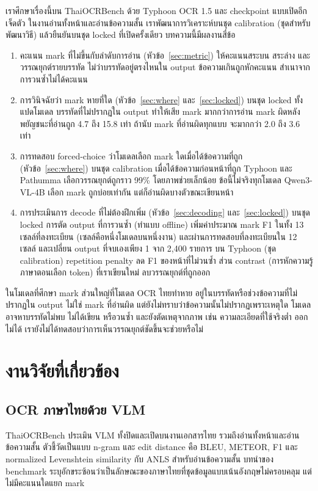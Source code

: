 เราศึกษาเรื่องนี้บน ThaiOCRBench ด้วย Typhoon OCR 1.5 และ checkpoint แบบเปิดอีกเจ็ดตัว ในงานอ่านทั้งหน้าและอ่านข้อความสั้น เราพัฒนาการวิเคราะห์บนชุด calibration (ชุดสำหรับพัฒนาวิธี) แล้วยืนยันบนชุด locked ที่เปิดครั้งเดียว บทความนี้มีผลงานสี่ข้อ
\begin{enumerate}
\item คะแนน mark ที่ไม่ขึ้นกับลำดับการอ่าน (หัวข้อ~\ref{sec:metric}) ให้คะแนนสระบน สระล่าง และวรรณยุกต์รายบรรทัด ไม่ว่าบรรทัดอยู่ตรงไหนใน output ข้อความเกินถูกหักคะแนน สำเนาจากการวนซ้ำไม่ได้คะแนน
\item การวินิจฉัยว่า mark หายที่ใด (หัวข้อ~\ref{sec:where} และ~\ref{sec:locked}) บนชุด locked ทั้งแปดโมเดล บรรทัดที่ไม่ปรากฏใน output ทำให้เสีย mark มากกว่าการอ่าน mark ผิดหลังพยัญชนะที่อ่านถูก 4.7 ถึง 15.8 เท่า ถ้านับ mark ที่อ่านผิดทุกแบบ จะมากกว่า 2.0 ถึง 3.6 เท่า
\item การทดสอบ forced-choice ว่าโมเดลเลือก mark ใดเมื่อได้ข้อความที่ถูก (หัวข้อ~\ref{sec:where}) บนชุด calibration เมื่อได้ข้อความก่อนหน้าที่ถูก Typhoon และ Pathumma เลือกวรรณยุกต์ถูกราว 99\% โดยภาพช่วยเล็กน้อย ข้อนี้ไม่จริงทุกโมเดล Qwen3-VL-4B เลือก mark ถูกบ่อยเท่ากัน แต่ก็อ่านผิดบางตัวขณะเขียนหน้า
\item การประเมินการ decode ที่ไม่ต้องฝึกเพิ่ม (หัวข้อ~\ref{sec:decoding} และ~\ref{sec:locked}) บนชุด locked การตัด output ที่การวนซ้ำ (ทำแบบ offline) เพิ่มค่าประมาณ mark F1 ในทั้ง 13 เซลล์ที่ลงทะเบียน (เซลล์คือหนึ่งโมเดลบนหนึ่งงาน) และผ่านการทดสอบที่ลงทะเบียนใน 12 เซลล์ และเปลี่ยน output ที่จบเองเพียง 1 จาก 2,400 รายการ บน Typhoon (ชุด calibration) repetition penalty ลด F1 ของหน้าที่ไม่วนซ้ำ ส่วน contrast (การหักความรู้ภาษาตอนเลือก token) ที่เราเขียนใหม่ ลบวรรณยุกต์ที่ถูกออก
\end{enumerate}
ในโมเดลที่ศึกษา mark ส่วนใหญ่ที่โมเดล OCR ไทยทำหาย อยู่ในบรรทัดหรือช่วงข้อความที่ไม่ปรากฏใน output ไม่ใช่ mark ที่อ่านผิด แต่ยังไม่ทราบว่าข้อความนั้นไม่ปรากฏเพราะเหตุใด โมเดลอาจหาบรรทัดไม่พบ ไม่ได้เขียน หรือวนซ้ำ และยังตัดเหตุจากภาพ เช่น ความละเอียดที่ใช้จริงต่ำ ออกไม่ได้ เรายังไม่ได้ทดสอบว่าการเห็นวรรณยุกต์ชัดขึ้นจะช่วยหรือไม่

\section{งานวิจัยที่เกี่ยวข้อง}
\subsection{OCR ภาษาไทยด้วย VLM}
ThaiOCRBench \cite{nonesung2025thaiocrbench} ประเมิน VLM ทั้งปิดและเปิดบนงานเอกสารไทย รวมถึงอ่านทั้งหน้าและอ่านข้อความสั้น ตัวชี้วัดเป็นแบบ n-gram และ edit distance คือ BLEU, METEOR, F1 และ normalized Levenshtein similarity กับ ANLS สำหรับอ่านข้อความสั้น บทนำของ benchmark ระบุอักขระซ้อนว่าเป็นลักษณะของภาษาไทยที่ชุดข้อมูลแบบเน้นอังกฤษไม่ครอบคลุม แต่ไม่มีคะแนนใดแยก mark

